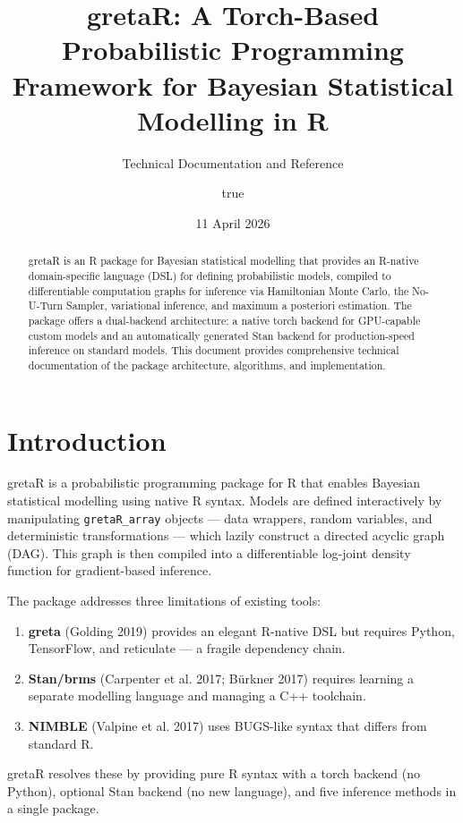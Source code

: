 \documentclass[
  11pt,
]{article}
\title{gretaR: A Torch-Based Probabilistic Programming Framework for
Bayesian Statistical Modelling in R}
\subtitle{Technical Documentation and Reference}
\author{true}
\date{11 April 2026}
\providecommand{\tightlist}{%
  \setlength{\itemsep}{0pt}\setlength{\parskip}{0pt}}
\begin{document}
\maketitle
\begin{abstract}
gretaR is an R package for Bayesian statistical modelling that provides
an R-native domain-specific language (DSL) for defining probabilistic
models, compiled to differentiable computation graphs for inference via
Hamiltonian Monte Carlo, the No-U-Turn Sampler, variational inference,
and maximum a posteriori estimation. The package offers a dual-backend
architecture: a native torch backend for GPU-capable custom models and
an automatically generated Stan backend for production-speed inference
on standard models. This document provides comprehensive technical
documentation of the package architecture, algorithms, and
implementation.
\end{abstract}

{
\setcounter{tocdepth}{3}
\tableofcontents
}
\section{Introduction}\label{introduction}

gretaR is a probabilistic programming package for R that enables
Bayesian statistical modelling using native R syntax. Models are defined
interactively by manipulating \texttt{gretaR\_array} objects --- data
wrappers, random variables, and deterministic transformations --- which
lazily construct a directed acyclic graph (DAG). This graph is then
compiled into a differentiable log-joint density function for
gradient-based inference.

The package addresses three limitations of existing tools:

\begin{enumerate}
\def\labelenumi{\arabic{enumi}.}
\tightlist
\item
  \textbf{greta} (Golding 2019) provides an elegant R-native DSL but
  requires Python, TensorFlow, and reticulate --- a fragile dependency
  chain.
\item
  \textbf{Stan/brms} (Carpenter et al. 2017; Bürkner 2017) requires
  learning a separate modelling language and managing a C++ toolchain.
\item
  \textbf{NIMBLE} (Valpine et al. 2017) uses BUGS-like syntax that
  differs from standard R.
\end{enumerate}

gretaR resolves these by providing pure R syntax with a torch backend
(no Python), optional Stan backend (no new language), and five inference
methods in a single package.
\end{document}
